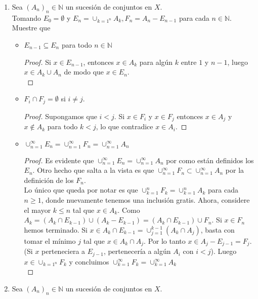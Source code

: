 \documentclass[spanish,12pt,a4paper,openany]{book}
\begin{document}
\begin{enumerate}
\begin{itemize}
		\end{itemize}
		\item Sea $(A_{n})_n \in \mathbb{N}$ un sucesión de conjuntos en $X$.\\
		Tomando $E_{0} = \emptyset$ y $E_{n} = \cup _{k=1 ^{n}} A_{k}, F_{n} = A_{n} - E_{n-1} $ para cada $n \in  \mathbb{N}$.\\
		Muestre que
		\begin{itemize}
			\item 	$E_{n-1} \subseteq E_{n}$ para todo $n \in \mathbb{N}$
			\begin{proof}
				Si $x \in E_{n-1}$, entonces $x \in A_{k}$ para algún $k$ entre $1$ y $n-1$, luego $x \in A_{k} \cup A_{n}$ de modo que $x \in E_{n}$.\\
			\end{proof}
			\item  $F_{i} \cap F_{j} = \emptyset $ si $i \neq j$.
			\begin{proof}
				Supongamos que $i<j$. Si $x \in F_{i}$ y $x \in F_{j}$ entonces $x \in A_{j}$ y $x \notin A_{k}$ para todo $k<j$, lo que contradice $x \in A_{i}$.
			\end{proof}
			\item $\cup _{n=1} ^{\infty} E_{n} = \cup _{n=1} ^{\infty} F_{n} = \cup _{n=1} ^{\infty} A_{n}$
			\begin{proof}
				Es evidente que $\cup _{n=1} ^{\infty} E_{n} = \cup _{n=1} ^{\infty} A_{n}$ por como están definidos los $E_{n}$. Otro hecho que salta a la vista es que $\cup _{n=1} ^ {\infty} F_{n} \subset \cup _{n=1} ^{\infty} A_{n}$ por la definición de los $F_{n}$.\\
				Lo único que queda por notar es que $\cup_{k=1} ^{n} F_{k} = \cup_{k=1} ^{n} A_{k}$ para cada $n \geq 1$, donde nuevamente tenemos una inclusión gratis. Ahora, considere el mayor $k \leq n $ tal que $x \in A_{k}$. Como $A_{k} = (A_{k} \cap E_{k-1}) \cup (A_{k} - E_{k-1}) = (A_{k} \cap E_{k-1}) \cup F_{n} $. Si $x \in F_{n}$ hemos terminado. Si $x \in A_{k} \cap E_{k-1} = \cup_{j=1} ^{k-1} (A_{k} \cap A_{j})$, basta con tomar el mínimo $j$ tal que $x \in A_{k} \cap A_{j}$. Por lo tanto $x \in A_{j} - E_{j-1} = F_{j}$. (Si $x$ perteneciera a $E_{j-1}$, pertenecería a algún $A_{i}$ con $i<j$). Luego $x \in \cup_{k=1 ^{n}} F_{k}$ y concluimos $\cup_{k=1} ^{\infty} F_{k} = \cup_{k=1} ^{\infty} A_{k}$\\			
			\end{proof}
		\end{itemize}
			\item Sea $(A_{n})_n \in \mathbb{N}$ un sucesión de conjuntos en $X$.\\
			

\end{enumerate}
\end{document}
